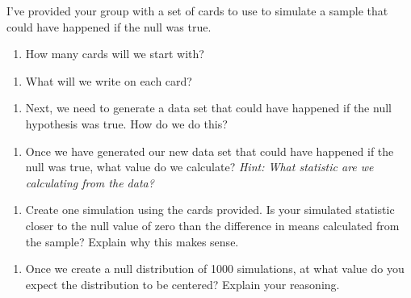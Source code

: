 \documentclass[
  letterpaper,
  DIV=11,
  numbers=noendperiod]{scrartcl}
\providecommand{\tightlist}{%
  \setlength{\itemsep}{0pt}\setlength{\parskip}{0pt}}\usepackage{longtable,booktabs,array}
\begin{document}
I've provided your group with a set of cards to use to simulate a sample
that could have happened if the null was true.

\begin{enumerate}
\def\labelenumi{\arabic{enumi}.}
\setcounter{enumi}{15}
\tightlist
\item
  How many cards will we start with?
\end{enumerate}

\vspace{0.3in}

\begin{enumerate}
\def\labelenumi{\arabic{enumi}.}
\setcounter{enumi}{16}
\tightlist
\item
  What will we write on each card?
\end{enumerate}

\vspace{0.3in}

\begin{enumerate}
\def\labelenumi{\arabic{enumi}.}
\setcounter{enumi}{17}
\tightlist
\item
  Next, we need to generate a data set that could have happened if the
  null hypothesis was true. How do we do this?
\end{enumerate}

\vspace{0.8in}

\begin{enumerate}
\def\labelenumi{\arabic{enumi}.}
\setcounter{enumi}{18}
\tightlist
\item
  Once we have generated our new data set that could have happened if
  the null was true, what value do we calculate? \emph{Hint: What
  statistic are we calculating from the data?}
\end{enumerate}

\vspace{0.3in}

\begin{enumerate}
\def\labelenumi{\arabic{enumi}.}
\setcounter{enumi}{19}
\tightlist
\item
  Create one simulation using the cards provided. Is your simulated
  statistic closer to the null value of zero than the difference in
  means calculated from the sample? Explain why this makes sense.
\end{enumerate}

\vspace{0.8in}

\begin{enumerate}
\def\labelenumi{\arabic{enumi}.}
\setcounter{enumi}{20}
\tightlist
\item
  Once we create a null distribution of 1000 simulations, at what value
  do you expect the distribution to be centered? Explain your reasoning.
\end{enumerate}
\end{document}
